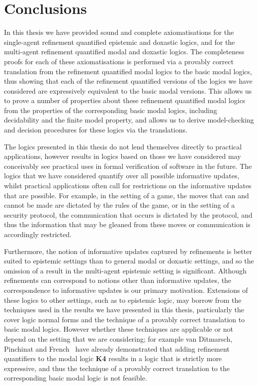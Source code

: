 \chapter{Conclusions}

In this thesis we have provided sound and complete axiomatisations for the
single-agent refinement quantified epistemic and doxastic logics, and for the
multi-agent refinement quantified modal and doxastic logics. The completeness
proofs for each of these axiomatisations is performed via a provably correct
translation from the refinement quantified modal logics to the basic modal
logics, thus showing that each of the refinement quantified versions of the
logics we have considered are expressively equivalent to the basic modal
versions. This allows us to prove a number of properties about these refinement
quantified modal logics from the properties of the corresponding basic modal
logics, including decidability and the finite model property, and allows us to
derive model-checking and decision procedures for these logics via the
translations.

The logics presented in this thesis do not lend themselves directly to practical
applications, however results in logics based on those we have considered may
conceivably see practical uses in formal verification of software in the future.
The logics that we have considered quantify over all possible informative
updates, whilst practical applications often call for restrictions on the
informative updates that are possible. For example, in the setting of a game,
the moves that can and cannot be made are dictated by the rules of the game, or
in the setting of a security protocol, the communication that occurs is dictated
by the protocol, and thus the information that may be gleaned from these moves
or communication is accordingly restricted.

Furthermore, the notion of informative updates captured by refinements is better
suited to epistemic settings than to general modal or doxastic settings, and so
the omission of a result in the multi-agent epistemic setting is significant.
Although refinements can correspond to notions other than informative updates,
the correspondence to informative updates is our primary motivation.  Extensions
of these logics to other settings, such as to epistemic logic, may borrow from
the techniques used in the results we have presented in this thesis,
particularly the cover logic normal forms and the technique of a provably
correct translation to basic modal logics. However whether these techniques are
applicable or not depend on the setting that we are considering; for example van
Ditmarsch, Pinchinat and French~\cite{french2010future} have already
demonstrated that adding refinement quantifiers to the modal logic {\bf K4}
results in a logic that is strictly more expressive, and thus the technique of a
provably correct translation to the corresponding basic modal logic is not
feasible.

